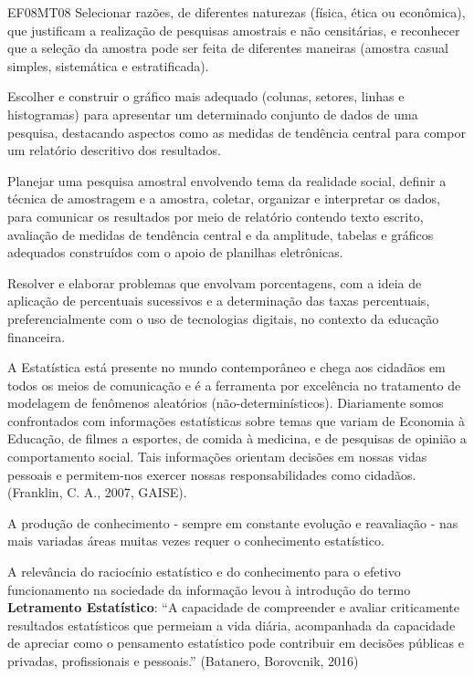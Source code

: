 \begin{apresentacao}
\begin{habilities}{EF08MT08}
Selecionar razões, de diferentes naturezas (física, ética ou econômica), que justificam a realização de pesquisas amostrais e não censitárias, e reconhecer que a seleção da amostra pode ser feita de diferentes maneiras (amostra casual simples, sistemática e estratificada).

Escolher e construir o gráfico mais adequado (colunas, setores, linhas e histogramas) para apresentar um determinado conjunto de dados de uma pesquisa, destacando aspectos como as medidas de tendência central para compor um relatório descritivo dos resultados.

Planejar uma pesquisa amostral envolvendo tema da realidade social, definir a técnica de amostragem e a amostra, coletar, organizar e interpretar os dados, para comunicar os resultados por meio de relatório contendo texto escrito, avaliação de medidas de tendência central e da amplitude, tabelas e gráficos adequados construídos com o apoio de planilhas eletrônicas.

Resolver e elaborar problemas que envolvam porcentagens, com a ideia de aplicação de percentuais sucessivos e a determinação das taxas percentuais, preferencialmente com o uso de tecnologias digitais, no contexto da educação financeira.
\end{habilities}

A Estatística está presente no mundo contemporâneo e chega aos cidadãos em todos os meios de comunicação e é a ferramenta por excelência no tratamento de modelagem de fenômenos aleatórios (não-determinísticos). Diariamente somos confrontados com informações estatísticas sobre temas que variam de Economia à Educação, de filmes a esportes, de comida à medicina, e de pesquisas de opinião a comportamento social. Tais informações orientam decisões em nossas vidas pessoais e permitem-nos exercer nossas responsabilidades como cidadãos. (Franklin, C. A., 2007, GAISE).

A produção de conhecimento - sempre em constante evolução e reavaliação - nas mais variadas áreas muitas vezes requer o conhecimento estatístico.

A relevância do raciocínio estatístico e do conhecimento para o efetivo funcionamento na sociedade da informação levou à introdução do termo \textbf{Letramento Estatístico}: “A capacidade de compreender e avaliar criticamente resultados estatísticos que permeiam a vida diária,  acompanhada da capacidade de apreciar como o pensamento estatístico pode contribuir em decisões públicas e privadas, profissionais e pessoais.” (Batanero, Borovcnik, 2016)


\end{apresentacao}

